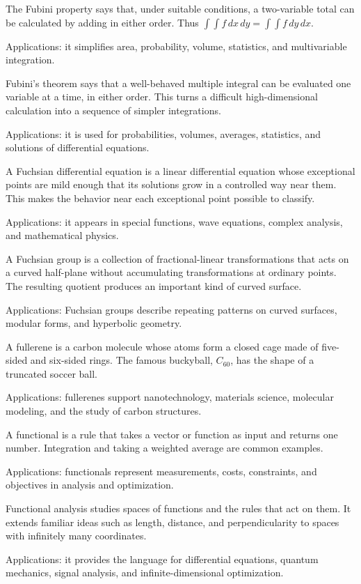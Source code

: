 The Fubini property says that, under suitable conditions, a two-variable total can be calculated by adding in either order. Thus $\int\!\int f\,dx\,dy=\int\!\int f\,dy\,dx$. \par\noindent Applications: it simplifies area, probability, volume, statistics, and multivariable integration.

Fubini's theorem says that a well-behaved multiple integral can be evaluated one variable at a time, in either order. This turns a difficult high-dimensional calculation into a sequence of simpler integrations. \par\noindent Applications: it is used for probabilities, volumes, averages, statistics, and solutions of differential equations.

A Fuchsian differential equation is a linear differential equation whose exceptional points are mild enough that its solutions grow in a controlled way near them. This makes the behavior near each exceptional point possible to classify. \par\noindent Applications: it appears in special functions, wave equations, complex analysis, and mathematical physics.

A Fuchsian group is a collection of fractional-linear transformations that acts on a curved half-plane without accumulating transformations at ordinary points. The resulting quotient produces an important kind of curved surface. \par\noindent Applications: Fuchsian groups describe repeating patterns on curved surfaces, modular forms, and hyperbolic geometry.

A fullerene is a carbon molecule whose atoms form a closed cage made of five-sided and six-sided rings. The famous buckyball, $C_{60}$, has the shape of a truncated soccer ball. \par\noindent Applications: fullerenes support nanotechnology, materials science, molecular modeling, and the study of carbon structures.

A functional is a rule that takes a vector or function as input and returns one number. Integration and taking a weighted average are common examples. \par\noindent Applications: functionals represent measurements, costs, constraints, and objectives in analysis and optimization.

Functional analysis studies spaces of functions and the rules that act on them. It extends familiar ideas such as length, distance, and perpendicularity to spaces with infinitely many coordinates. \par\noindent Applications: it provides the language for differential equations, quantum mechanics, signal analysis, and infinite-dimensional optimization.

